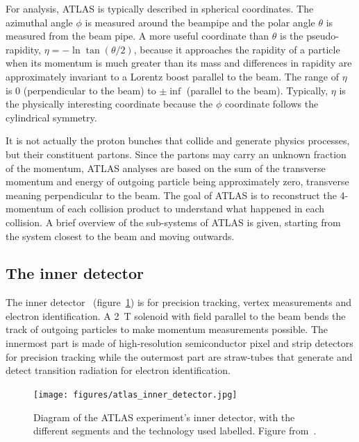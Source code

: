 For analysis, ATLAS is typically described in spherical coordinates. The azimuthal angle $\phi$ is measured around the beampipe and the polar angle $\theta$ is measured from the beam pipe. A more useful coordinate than $\theta$ is the pseudo-rapidity, $\eta = -\ln\tan\left(\theta/2\right)$, because it approaches the rapidity of a particle when its momentum is much greater than its mass and differences in rapidity are approximately invariant to a Lorentz boost parallel to the beam. The range of $\eta$ is 0 (perpendicular to the beam) to $\pm\inf$ (parallel to the beam). Typically, $\eta$ is the physically interesting coordinate because the $\phi$ coordinate follows the cylindrical symmetry.

It is not actually the proton bunches that collide and generate physics processes, but their constituent partons. Since the partons may carry an unknown fraction of the momentum, ATLAS analyses are based on the sum of the transverse momentum and energy of outgoing particle being approximately zero, transverse meaning perpendicular to the beam. The goal of ATLAS is to reconstruct the 4-momentum of each collision product to understand what happened in each collision. A brief overview of the sub-systems of ATLAS is given, starting from the system closest to the beam and moving outwards. 

\subsection{The inner detector}
The inner detector~\cite{atlas_inner_detector_tdr_1, atlas_inner_detector_tdr_2} (figure~\ref{fig:atlas_inner_detector}) is for precision tracking, vertex measurements and electron identification. A \SI{2}{\tesla} solenoid with field parallel to the beam bends the track of outgoing particles to make momentum measurements possible. The innermost part is made of high-resolution semiconductor pixel and strip detectors for precision tracking while the outermost part are straw-tubes that generate and detect transition radiation for electron identification.

\begin{figure}
    \centering
    \texttt{[image: figures/atlas\_inner\_detector.jpg]}
    \caption{Diagram of the ATLAS experiment's inner detector, with the different segments and the technology used labelled. Figure from~\cite{collaboration_atlas_2008}.}
    \label{fig:atlas_inner_detector}
\end{figure}

